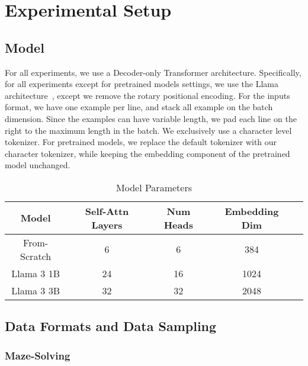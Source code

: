\section{Experimental Setup}\label{sec:exp_setup}

\subsection{Model}

For all experiments, we use a Decoder-only Transformer architecture. Specifically, for all experiments except for pretrained models settings, we use the Llama architecture~\citep{llama3modelcard}, except we remove the rotary positional encoding. 
For the inputs format, we have one example per line, and stack all example on the batch dimension. Since the examples can have variable length, we pad each line on the right to the maximum length in the batch. 
We exclusively use a character level tokenizer. For pretrained models, we replace the default tokenizer with our character tokenizer, while keeping the embedding component of the pretrained model unchanged. 

\begin{table}[ht!]
\caption{Model Parameters}
\footnotesize
\vspace{1mm}
\centering
\small
\setlength{\tabcolsep}{4pt} %
\renewcommand{\arraystretch}{0.5}
     {
        \begin{tabular}{ccccc} %
        \toprule
        Model & Self-Attn Layers & Num Heads & Embedding Dim \\
        \midrule 
        From-Scratch &  6 &  6 &  384 \\
        Llama 3 1B &  24 &  16 &  1024 \\
        Llama 3 3B &  32 &  32 &  2048 \\
        \bottomrule
        \end{tabular}
    }
\label{table:model_config}
\end{table}

\subsection{Data Formats and Data Sampling}\label{sec:data_gen}
\subsubsection{Maze-Solving}\label{sec:data_gen-maze}

